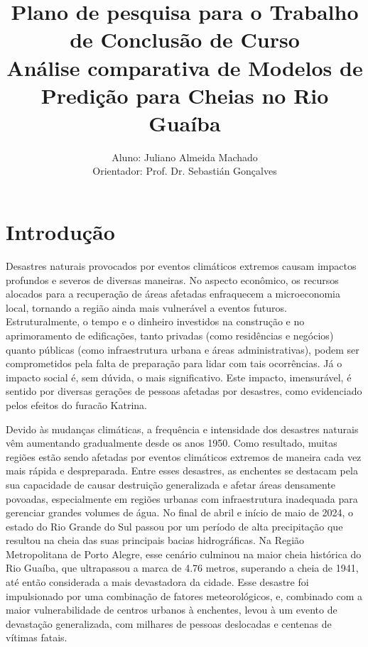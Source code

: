 \documentclass[
	12pt,				%
	openright,			%
	a4paper,			%
	english,			%
	french,				%
	spanish,			%
	brazil				%
	]{article}
\title{Plano de pesquisa para o Trabalho de Conclusão de Curso\\\large Análise comparativa de Modelos de Predição para Cheias no Rio Guaíba}
\author{Aluno: Juliano Almeida Machado \\
Orientador: Prof. Dr. Sebastián Gonçalves}
\date{}
\begin{document}
\maketitle

\section{Introdução}
Desastres naturais provocados por eventos climáticos extremos causam impactos profundos e severos de diversas maneiras. No aspecto econômico, os recursos alocados para a recuperação de áreas afetadas enfraquecem a microeconomia local, tornando a região ainda mais vulnerável a eventos futuros. Estruturalmente, o tempo e o dinheiro investidos na construção e no aprimoramento de edificações, tanto privadas (como residências e negócios) quanto públicas (como infraestrutura urbana e áreas administrativas), podem ser comprometidos pela falta de preparação para lidar com tais ocorrências. Já o impacto social é, sem dúvida, o mais significativo. Este impacto, imensurável, é sentido por diversas gerações de pessoas afetadas por desastres, como evidenciado pelos efeitos do furacão Katrina\cite{reardon}\cite{neria}.

Devido às mudanças climáticas, a frequência e intensidade dos desastres naturais vêm aumentando gradualmente desde os anos 1950\cite{dunn}. Como resultado, muitas regiões estão sendo afetadas por eventos climáticos extremos de maneira cada vez mais rápida e despreparada. Entre esses desastres, as enchentes se destacam pela sua capacidade de causar destruição generalizada e afetar áreas densamente povoadas, especialmente em regiões urbanas com infraestrutura inadequada para gerenciar grandes volumes de água. No final de abril e início de maio de 2024, o estado do Rio Grande do Sul passou por um período de alta precipitação que resultou na cheia das suas principais bacias hidrográficas. Na Região Metropolitana de Porto Alegre, esse cenário culminou na maior cheia histórica do Rio Guaíba, que ultrapassou a marca de 4.76 metros, superando a cheia de 1941, até então considerada a mais devastadora da cidade\cite{dep}. Esse desastre foi impulsionado por uma combinação de fatores meteorológicos, e, combinado com a maior vulnerabilidade de centros urbanos à enchentes\cite{yang}\cite{hammond}\cite{zhang}\cite{pereira}, levou à um evento de devastação generalizada, com milhares de pessoas deslocadas e centenas de vítimas fatais\cite{alcantara}. 
\end{document}
